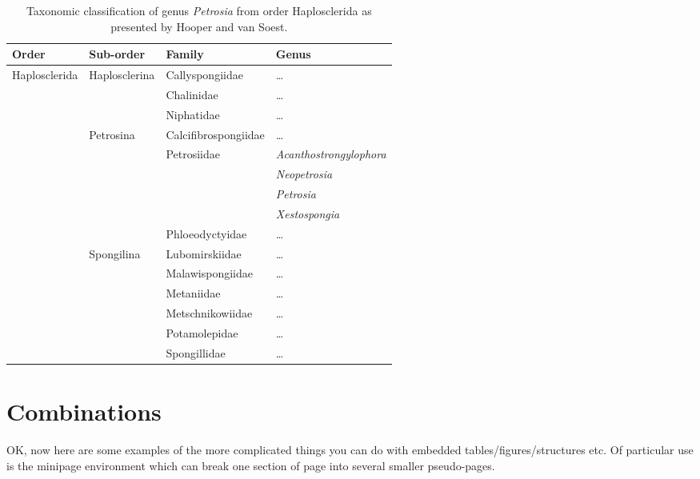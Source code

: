 \begin{table}[t]
\caption[Taxonomic classification of genus \emph{Petrosia} from order Haplosclerida.]{Taxonomic classification of genus \emph{Petrosia} from order Haplosclerida as presented by Hooper and van Soest.\cite{1}}
\label{tab:petrosia}
\begin{center}
\footnotesize
\begin{tabular}{l|l|l|l}
Order & Sub-order & Family & Genus \\
\hline
\hline
\multirow{15}{*}{\color{blue}Haplosclerida} & \multirow{3}{*}{Haplosclerina} & Callyspongiidae & \ldots \\ 
\cline{3-4}
 & & Chalinidae & \ldots \\
\cline{3-4}
 & & Niphatidae & \ldots \\
\cline{2-4}
 & \multirow{6}{*}{\color{blue}Petrosina} & Calcifibrospongiidae & \ldots \\
\cline{3-4}
 & & \multirow{4}{*}{\color{blue}Petrosiidae} & \emph{Acanthostrongylophora} \\
\cline{4-4}
 & & & \emph{Neopetrosia} \\
\cline{4-4}
 & & & \color{blue}\emph{Petrosia} \\
\cline{4-4}
 & & & \emph{Xestospongia} \\
\cline{3-4}
 & & Phloeodyctyidae & \ldots \\
\cline{2-4}
 & \multirow{6}{*}{Spongilina} & Lubomirskiidae & \ldots \\
\cline{3-4}
 & & Malawispongiidae & \ldots \\
\cline{3-4}
 & & Metaniidae & \ldots \\
\cline{3-4}
 & & Metschnikowiidae & \ldots \\
\cline{3-4}
 & & Potamolepidae & \ldots \\
\cline{3-4}
 & & Spongillidae & \ldots \\
\hline
\end{tabular}
\end{center}
\end{table}

\section{Combinations}

OK, now here are some examples of the more complicated things you can do with embedded tables/figures/structures etc.  Of particular use is the minipage environment which can break one section of page into several smaller pseudo-pages.


